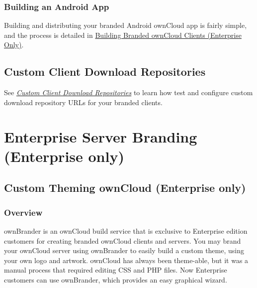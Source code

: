 \documentclass[letterpaper,10pt,english]{sphinxmanual}
\begin{document}
\subsubsection{Building an Android App}
\label{enterprise_clients/creating_branded_apps:building-an-android-app}
Building and distributing your branded Android ownCloud app is fairly simple,
and the process is detailed in
\href{https://doc.owncloud.com/branded\_clients/}{Building Branded ownCloud Clients (Enterprise Only)}.


\subsection{Custom Client Download Repositories}
\label{enterprise_clients/custom_client_repos:building-branded-owncloud-clients-enterprise-only}\label{enterprise_clients/custom_client_repos::doc}\label{enterprise_clients/custom_client_repos:custom-client-download-repositories}
See {\hyperref[configuration_server/custom_client_repos::doc]{\emph{\emph{Custom Client Download Repositories}}}} to learn how test and
configure custom download repository URLs for your branded clients.


\section{Enterprise Server Branding (Enterprise only)}
\label{enterprise_server_branding/index:enterprise-server-branding-enterprise-only}\label{enterprise_server_branding/index::doc}

\subsection{Custom Theming ownCloud (Enterprise only)}
\label{enterprise_server_branding/enterprise_server_branding::doc}\label{enterprise_server_branding/enterprise_server_branding:custom-theming-owncloud-enterprise-only}

\subsubsection{Overview}
\label{enterprise_server_branding/enterprise_server_branding:overview}
ownBrander is an ownCloud build service that is exclusive to Enterprise
edition customers for creating branded ownCloud clients and servers. You
may brand your ownCloud server using ownBrander to easily build a custom theme,
using your own logo and artwork. ownCloud has always been theme-able, but it was
a manual process that required editing CSS and PHP files. Now Enterprise
customers can use ownBrander, which provides an easy graphical wizard.
\end{document}
